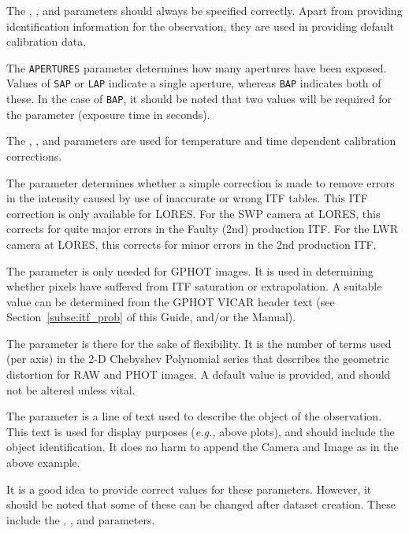 The , ,
 and 
 parameters should always be 
specified correctly. Apart from providing identification information for 
the observation, they are used in providing default calibration data.

The \verb+APERTURES+ parameter determines how many apertures have been exposed.
Values of \verb+SAP+ or \verb+LAP+ indicate a single aperture, whereas
\verb+BAP+ indicates both of these.  In the case of \verb+BAP+, it should be
noted that two values will be required for the 
 parameter
(exposure time in seconds)\@.

The , ,
 and 
parameters are used for temperature and time dependent calibration
corrections.

The  parameter determines whether a 
simple correction is made to
remove errors in the intensity caused by use of inaccurate or wrong ITF tables.
This ITF correction is only available for LORES\@.  For the SWP camera at
LORES, this corrects for quite major errors in the Faulty (2nd) production
ITF\@.  For the LWR camera at LORES, this corrects for minor errors in the 2nd
production ITF\@.

The  parameter is only needed for GPHOT 
images.  It is used in
determining whether pixels have suffered from ITF saturation or
extrapolation.  A suitable value can be determined from the GPHOT VICAR
header text (see Section~\ref{subse:itf_prob} of this Guide, and/or the
Manual)\@.

The  parameter is there for the sake of 
flexibility.  It is the
number of terms used (per axis) in the 2-D Chebyshev Polynomial series that
describes the geometric distortion for RAW and PHOT images.  A default value is
provided, and should not be altered unless vital.

The  parameter is a line of text used 
to describe the object of
the observation.  This text is used for display purposes ({\it{e.g.,}} above
plots), and should include the object identification.
It does no harm to append the Camera and Image as in the above example.

It is a good idea to provide correct values for these 
 parameters.
However, it should be noted that some of these can be changed after dataset
creation.  These include the ,
, 
and  parameters.


